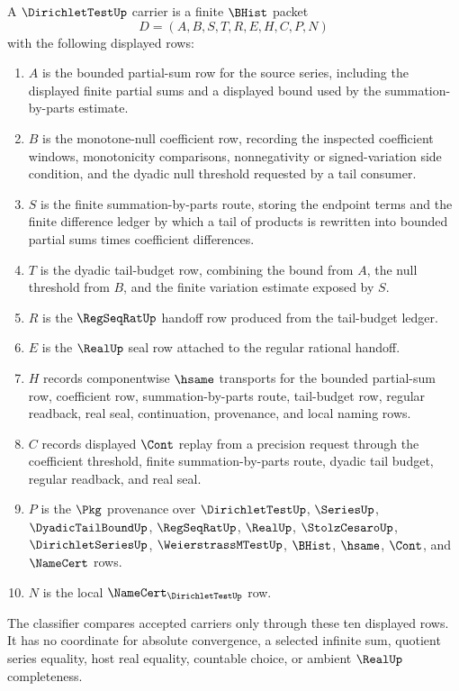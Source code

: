 \begin{definition}
\label{def:dirichlet-test-carrier}
A $\DirichletTestUp$ carrier is a finite $\BHist$ packet
$$
D=(A,B,S,T,R,E,H,C,P,N)
$$
with the following displayed rows:
\begin{enumerate}
\item $A$ is the bounded partial-sum row for the source series, including the displayed finite partial sums and a displayed bound used by the summation-by-parts estimate.
\item $B$ is the monotone-null coefficient row, recording the inspected coefficient windows, monotonicity comparisons, nonnegativity or signed-variation side condition, and the dyadic null threshold requested by a tail consumer.
\item $S$ is the finite summation-by-parts route, storing the endpoint terms and the finite difference ledger by which a tail of products is rewritten into bounded partial sums times coefficient differences.
\item $T$ is the dyadic tail-budget row, combining the bound from $A$, the null threshold from $B$, and the finite variation estimate exposed by $S$.
\item $R$ is the $\RegSeqRatUp$ handoff row produced from the tail-budget ledger.
\item $E$ is the $\RealUp$ seal row attached to the regular rational handoff.
\item $H$ records componentwise $\hsame$ transports for the bounded partial-sum row, coefficient row, summation-by-parts route, tail-budget row, regular readback, real seal, continuation, provenance, and local naming rows.
\item $C$ records displayed $\Cont$ replay from a precision request through the coefficient threshold, finite summation-by-parts route, dyadic tail budget, regular readback, and real seal.
\item $P$ is the $\Pkg$ provenance over $\DirichletTestUp$, $\SeriesUp$, $\DyadicTailBoundUp$, $\RegSeqRatUp$, $\RealUp$, $\StolzCesaroUp$, $\DirichletSeriesUp$, $\WeierstrassMTestUp$, $\BHist$, $\hsame$, $\Cont$, and $\NameCert$ rows.
\item $N$ is the local $\NameCert_{\DirichletTestUp}$ row.
\end{enumerate}
The classifier compares accepted carriers only through these ten displayed rows. It has no coordinate for absolute convergence, a selected infinite sum, quotient series equality, host real equality, countable choice, or ambient $\RealUp$ completeness.
\end{definition}

